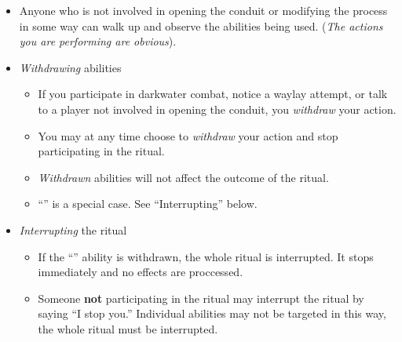 \documentclass[green]{elementals}
\begin{document}
\begin{itemize}
  \item Anyone who is not involved in opening the conduit or modifying the process in some way can walk up and observe the abilities being used. (\emph{The actions you are performing are obvious}).
  \item \emph{Withdrawing} abilities
  \begin{itemize}
  	\item If you participate in darkwater combat, notice a waylay attempt, or talk to a player not involved in opening the conduit, you \emph{withdraw} your action.
  	\item You may at any time choose to \emph{withdraw} your action and stop participating in the ritual. 
  	\item \emph{Withdrawn} abilities will not affect the outcome of the ritual.
  	\item ``\aWorkConduit{}'' is a special case. See ``Interrupting'' below.
  \end{itemize}
  \item \emph{Interrupting} the ritual
  \begin{itemize}
  	\item If the ``\aWorkConduit{}'' ability is withdrawn, the whole ritual is interrupted. It stops immediately and no effects are proccessed.
  	\item Someone {\bf not} participating in the ritual may interrupt the ritual by saying ``I stop you.'' Individual abilities may not be targeted in this way, the whole ritual must be interrupted.
  \end{itemize}
\end{itemize}
\end{document}
